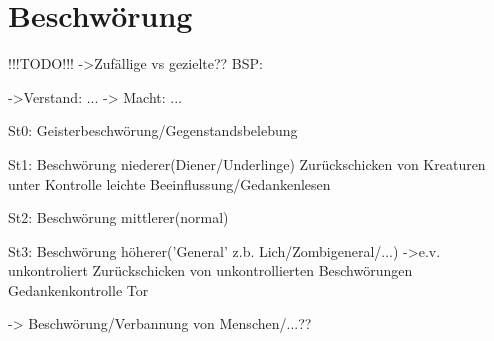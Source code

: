 \section{Beschwörung}
\begin{TODO}!!!TODO!!!
->Zufällige vs gezielte??
BSP:

->Verstand: ...
-> Macht: ...

St0:
Geisterbeschwörung/Gegenstandsbelebung

St1:
Beschwörung niederer(Diener/Underlinge)
Zurückschicken von Kreaturen unter Kontrolle
leichte Beeinflussung/Gedankenlesen

St2:
Beschwörung mittlerer(normal)


St3:
Beschwörung höherer('General' z.b. Lich/Zombigeneral/...)
->e.v. unkontroliert
Zurückschicken von unkontrollierten Beschwörungen
Gedankenkontrolle
Tor

-> Beschwörung/Verbannung von Menschen/...??
\end{TODO}
